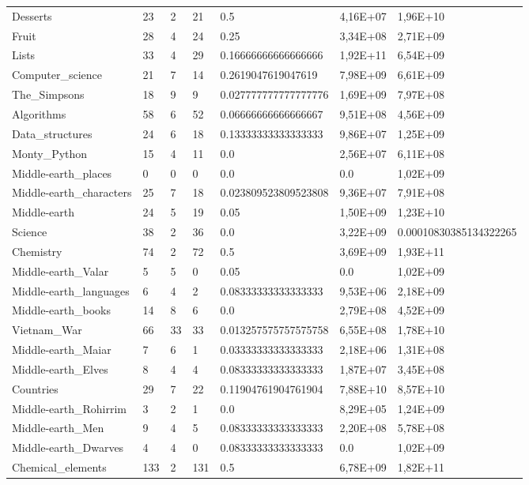 \begin{longtable}{@{}lllllll@{}}
Desserts & 23 & 2 & 21 & 0.5 & 4,16E+07 & 1,96E+10 \\
Fruit & 28 & 4 & 24 & 0.25 & 3,34E+08 & 2,71E+09 \\
Lists & 33 & 4 & 29 & 0.16666666666666666 & 1,92E+11 & 6,54E+09 \\
Computer\_science & 21 & 7 & 14 & 0.2619047619047619 & 7,98E+09 & 6,61E+09 \\
The\_Simpsons & 18 & 9 & 9 & 0.027777777777777776 & 1,69E+09 & 7,97E+08 \\
Algorithms & 58 & 6 & 52 & 0.06666666666666667 & 9,51E+08 & 4,56E+09 \\
Data\_structures & 24 & 6 & 18 & 0.13333333333333333 & 9,86E+07 & 1,25E+09 \\
Monty\_Python & 15 & 4 & 11 & 0.0 & 2,56E+07 & 6,11E+08 \\
Middle-earth\_places & 0 & 0 & 0 & 0.0 & 0.0 & 1,02E+09 \\
Middle-earth\_characters & 25 & 7 & 18 & 0.023809523809523808 & 9,36E+07 & 7,91E+08 \\
Middle-earth & 24 & 5 & 19 & 0.05 & 1,50E+09 & 1,23E+10 \\
Science & 38 & 2 & 36 & 0.0 & 3,22E+09 & 0.00010830385134322265 \\
Chemistry & 74 & 2 & 72 & 0.5 & 3,69E+09 & 1,93E+11 \\
Middle-earth\_Valar & 5 & 5 & 0 & 0.05 & 0.0 & 1,02E+09 \\
Middle-earth\_languages & 6 & 4 & 2 & 0.08333333333333333 & 9,53E+06 & 2,18E+09 \\
Middle-earth\_books & 14 & 8 & 6 & 0.0 & 2,79E+08 & 4,52E+09 \\
Vietnam\_War & 66 & 33 & 33 & 0.013257575757575758 & 6,55E+08 & 1,78E+10 \\
Middle-earth\_Maiar & 7 & 6 & 1 & 0.03333333333333333 & 2,18E+06 & 1,31E+08 \\
Middle-earth\_Elves & 8 & 4 & 4 & 0.08333333333333333 & 1,87E+07 & 3,45E+08 \\
Countries & 29 & 7 & 22 & 0.11904761904761904 & 7,88E+10 & 8,57E+10 \\
Middle-earth\_Rohirrim & 3 & 2 & 1 & 0.0 & 8,29E+05 & 1,24E+09 \\
Middle-earth\_Men & 9 & 4 & 5 & 0.08333333333333333 & 2,20E+08 & 5,78E+08 \\
Middle-earth\_Dwarves & 4 & 4 & 0 & 0.08333333333333333 & 0.0 & 1,02E+09 \\
Chemical\_elements & 133 & 2 & 131 & 0.5 & 6,78E+09 & 1,82E+11 \\

\end{longtable}
